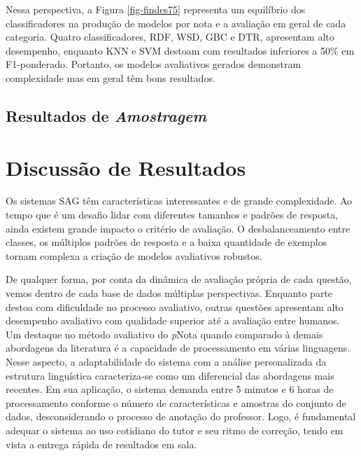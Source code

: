 Nessa perspectiva, a Figura \ref{fig-findes75} representa um equilíbrio dos classificadores na produção de modelos por nota e a avaliação em geral de cada categoria. Quatro classificadores, RDF, WSD, GBC e DTR, apresentam alto desempenho, enquanto KNN e SVM destoam com resultados inferiores a 50\% em F1-ponderado. Portanto, os modelos avaliativos gerados demonstram complexidade mas em geral têm bons resultados.


\subsection{Resultados de \textit{Amostragem}}
\label{sec-res-amostragem}


\section{Discussão de Resultados}
\label{sec-discussao}

Os sistemas SAG têm características interessantes e de grande complexidade. Ao tempo que é um desafio lidar com diferentes tamanhos e padrões de resposta, ainda existem grande impacto o critério de avaliação. O desbalanceamento entre classes, os múltiplos padrões de resposta e a baixa quantidade de exemplos tornam complexa a criação de modelos avaliativos robustos.

De qualquer forma, por conta da dinâmica de avaliação própria de cada questão, vemos dentro de cada base de dados múltiplas perspectivas. Enquanto parte destoa com dificuldade no processo avaliativo, outras questões apresentam alto desempenho avaliativo com qualidade superior até a avaliação entre humanos. Um destaque no método avaliativo do \textit{p}Nota quando comparado à demais abordagens da literatura é a capacidade de processamento em várias linguagens. Nesse aspecto, a adaptabilidade do sistema com a análise personalizada da estrutura linguística caracteriza-se como um diferencial das abordagens mais recentes. Em sua aplicação, o sistema demanda entre 5 minutos e 6 horas de processamento conforme o número de características e amostras do conjunto de dados, desconsiderando o processo de anotação do professor. Logo, é fundamental adequar o sistema ao uso cotidiano do tutor e seu ritmo de correção, tendo em vista a entrega rápida de resultados em sala.

